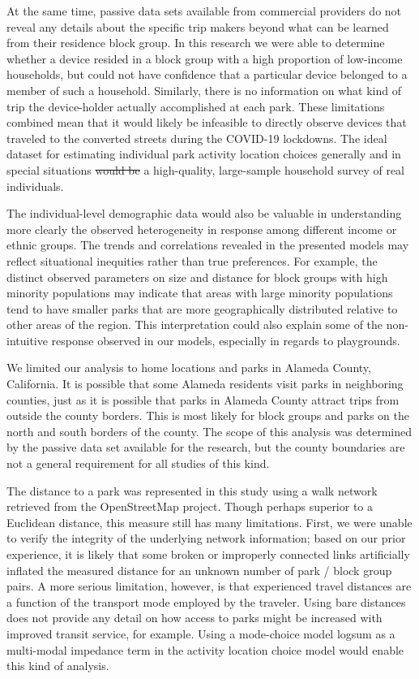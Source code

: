 \documentclass[3p, authoryear, review]{elsarticle} %
\providecommand{\DIFaddtex}[1]{{\protect\color{blue}\uwave{#1}}} %
\providecommand{\DIFdeltex}[1]{{\protect\color{red}\sout{#1}}}                      %
\providecommand{\DIFaddbegin}{} %
\providecommand{\DIFaddend}{} %
\providecommand{\DIFdelbegin}{} %
\providecommand{\DIFdelend}{} %
\providecommand{\DIFadd}[1]{\texorpdfstring{\DIFaddtex{#1}}{#1}} %
\providecommand{\DIFdel}[1]{\texorpdfstring{\DIFdeltex{#1}}{}} %
\newcommand{\DIFscaledelfig}{0.5}
\newlength{\DIFdelgraphicswidth} %
\newlength{\DIFdelgraphicsheight} %
\newcommand{\DIFaddincludegraphics}[2][]{{\color{blue}\fbox{\DIFOincludegraphics[#1]{#2}}}} %
\newcommand{\DIFdelincludegraphics}[2][]{%
\sbox{\DIFdelgraphicsbox}{\DIFOincludegraphics[#1]{#2}}%
\settoboxwidth{\DIFdelgraphicswidth}{\DIFdelgraphicsbox} %
\settoboxtotalheight{\DIFdelgraphicsheight}{\DIFdelgraphicsbox} %
\scalebox{\DIFscaledelfig}{%
\parbox[b]{\DIFdelgraphicswidth}{\usebox{\DIFdelgraphicsbox}\\[-\baselineskip] \rule{\DIFdelgraphicswidth}{0em}}\llap{\resizebox{\DIFdelgraphicswidth}{\DIFdelgraphicsheight}{%
\setlength{\unitlength}{\DIFdelgraphicswidth}%
\begin{picture}(1,1)%
\thicklines\linethickness{2pt} %
{\color[rgb]{1,0,0}\put(0,0){\framebox(1,1){}}}%
{\color[rgb]{1,0,0}\put(0,0){\line( 1,1){1}}}%
{\color[rgb]{1,0,0}\put(0,1){\line(1,-1){1}}}%
\end{picture}%
}\hspace*{3pt}}} %
} %
\DeclareRobustCommand{\DIFaddbegin}{\DIFOaddbegin \let\includegraphics\DIFaddincludegraphics} %
\DeclareRobustCommand{\DIFaddend}{\DIFOaddend \let\includegraphics\DIFOincludegraphics} %
\DeclareRobustCommand{\DIFdelbegin}{\DIFOdelbegin \let\includegraphics\DIFdelincludegraphics} %
\DeclareRobustCommand{\DIFdelend}{\DIFOaddend \let\includegraphics\DIFOincludegraphics} %
\begin{document}
At the same time, passive data sets available from commercial providers do not
reveal any details about the specific trip makers beyond what can be learned
from their residence block group. In this research we were able to determine
whether a device resided in a block group with a high proportion of low-income
households, but could not have confidence that a particular device belonged to a
member of such a household. Similarly, there is no information on what kind of
trip the device-holder actually accomplished at each park. These limitations
combined mean that it would likely be infeasible to directly observe devices
that traveled to the converted streets during the COVID-19 lockdowns. The ideal
dataset for estimating individual park activity location choices generally and
in special situations \DIFdelbegin \DIFdel{would be }\DIFdelend \DIFaddbegin \DIFadd{remains }\DIFaddend a high-quality, large-sample household survey of
real individuals.

The individual-level demographic data would also be valuable in understanding
more clearly the observed heterogeneity in response among different income or
ethnic groups. The trends and correlations revealed in the presented models may
reflect situational inequities rather than true preferences. For example, the
distinct observed parameters on size and distance for block groups with high
minority populations may indicate that areas with large minority populations
tend to have smaller parks that are more geographically distributed relative to
other areas of the region. This interpretation could also explain some of the
non-intuitive response observed in our models, especially in regards to
playgrounds.

We limited our analysis to home locations and parks in Alameda County,
California. It is possible that some Alameda residents visit parks in
neighboring counties, just as it is possible that parks in Alameda County
attract trips from outside the county borders. This is most likely for block
groups and parks on the north and south borders of the county. The scope of this
analysis was determined by the passive data set available for the research, but
the county boundaries are not a general requirement for all studies of this
kind.

The distance to a park was represented in this study using a walk network
retrieved from the OpenStreetMap project. Though perhaps superior to a Euclidean
distance, this measure still has many limitations. First, we were unable to
verify the integrity of the underlying network information; based on our prior
experience, it is likely that some broken or improperly connected links
artificially inflated the measured distance for an unknown number of park /
block group pairs. A more serious limitation, however, is that experienced
travel distances are a function of the transport mode employed by the traveler.
Using bare distances does not provide any detail on how access to parks might be
increased with improved transit service, for example. Using a mode-choice model
logsum as a multi-modal impedance term in the activity location choice model
would enable this kind of analysis.
\end{document}
